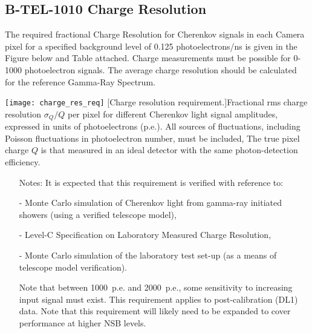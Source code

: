 \begin{requirement}{\subsection{B-TEL-1010 Charge Resolution}} \label{section:cr}
	The required fractional Charge Resolution for Cherenkov signals in each Camera pixel for a specified background level of 0.125 photoelectrons/ns is given in the Figure below and Table attached. Charge measurements must be possible for 0-1000 photoelectron signals. The average charge resolution should be calculated for the reference Gamma-Ray Spectrum.
    
	\centering\texttt{[image: charge\_res\_req]}
	[Charge resolution requirement.]{Fractional rms charge resolution $\sigma_Q/Q$ per pixel for different Cherenkov light signal amplitudes, expressed in units of photoelectrons (p.e.). All sources of fluctuations, including Poisson fluctuations in photoelectron number, must be included, The true pixel charge $Q$ is that measured in an ideal detector with the same photon-detection efficiency. }\label{fig:charge_res_req}
    
\begin{itemize}
\item [Notes:] It is expected that this requirement is verified with reference to:

- Monte Carlo simulation of Cherenkov light from gamma-ray initiated showers (using a verified telescope model),

- Level-C Specification on Laboratory Measured Charge Resolution,

- Monte Carlo simulation of the laboratory test set-up (as a means of telescope model verification).

Note that between 1000~p.e. and 2000~p.e., some sensitivity to increasing input signal must exist. \newline
This requirement applies to post-calibration (DL1) data. \newline
Note that this requirement will likely need to be expanded to cover performance at higher NSB levels.
\end{itemize}
\end{requirement}

